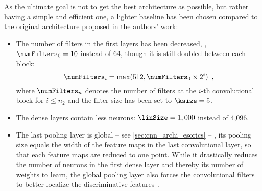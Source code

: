 As the ultimate goal is not to get the best architecture as possible, but rather having a simple and efficient one, a lighter baseline has been chosen compared to the original architecture proposed in the authors' work: 
\begin{itemize}
	\item The number of filters in the first layers has been decreased, \ie{}, \(\numFilters_0 = 10\) instead of 64, though it is still doubled between each block: 
	\begin{equation}
		\numFilters_i = \max(512, \numFilters_0 \times 2^i) \enspace ,
	\end{equation}
	where \(\numFilters_n\) denotes the number of filters at the \(i\)-th convolutional block for \(i \leq n_2\) and the filter size has been set to \(\ksize=5\).
	\item The dense layers contain less neurons: \(\linSize = 1,000\) instead of 4,096.
	\item The last pooling layer is global -- see \autoref{sec:cnn_archi_esorics} -- \ie{}, its pooling size equals the width of the feature maps in the last convolutional layer, so that each feature maps are reduced to one point.
	While it drastically reduces the number of neurons in the first dense layer and thereby its number of weights to learn, the global pooling layer also forces the convolutional filters to better localize the discriminative features~\cite{zhou_learning_2016}.
\end{itemize}

